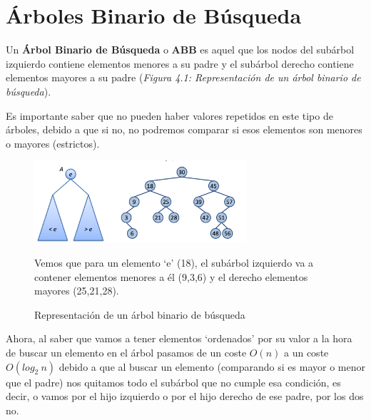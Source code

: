 \chapter{Árboles Binario de Búsqueda}
Un \textbf{Árbol Binario de Búsqueda} o \textbf{ABB} es aquel que los nodos del subárbol izquierdo contiene elementos menores a su padre y el subárbol derecho contiene elementos mayores a su padre (\textit{Figura 4.1: Representación de un árbol binario de búsqueda}).

Es importante saber que no pueden haber valores repetidos en este tipo de árboles, debido a que si no, no podremos comparar si esos elementos son menores o mayores (estrictos).

\begin{figure}[h]
  \begin{center}
    \includegraphics[width=0.7\textwidth]{assets/ABB1.png}
  \end{center}
  \caption{Representación de un árbol binario de búsqueda}
  Vemos que para un elemento `e' (18), el subárbol izquierdo va a contener elementos menores a él (9,3,6) y el derecho elementos mayores (25,21,28).
\end{figure}

Ahora, al saber que vamos a tener elementos `ordenados' por su valor a la hora de buscar un elemento en el árbol pasamos de un coste \textbf{\(O(n)\)} a un coste \textbf{\(O(log_{2}\ n)\)} debido a que al buscar un elemento (comparando si es mayor o menor que el padre) nos quitamos todo el subárbol que no cumple esa condición, es decir, o vamos por el hijo izquierdo o por el hijo derecho de ese padre, por los dos no.

